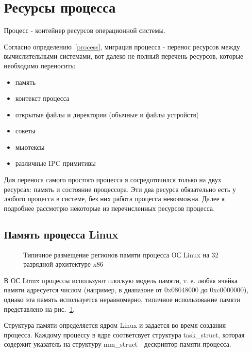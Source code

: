 \section{Ресурсы процесса}

\begin{Def}\label{process}
Процесс - контейнер ресурсов операционной системы.
\end{Def}

Согласно определению~\ref{process}, миграция процесса - перенос ресурсов между вычислительными системами, вот далеко не полный перечень ресурсов, которые необходимо переносить:

\begin{itemize}

    \item память
    \item контекст процесса
    \item открытые файлы и директории (обычные и файлы устройств)
    \item сокеты
    \item мьютексы
    \item различные IPC примитивы

\end{itemize}

Для переноса самого простого процесса я сосредоточился только на двух ресурсах: память и состояние процессора. Эти два ресурса обязательно есть у любого процесса в системе, без них работа процесса невозможна. Далее я подробнее рассмотрю некоторые из перечисленных ресурсов процесса. 

\subsection{Память процесса Linux}

\begin{figure}[h]
\caption{Типичное размещение регионов памяти процесса ОС Linux на 32 разрядной архитектуре x86}
\label{pic:memory_layout}
\end{figure}

В ОС Linux процессы используют плоскую модель памяти, т. е. любая ячейка памяти адресуется числом (например, в диапазоне от 0x08048000 до 0xc0000000), однако эта память используется неравномерно, типичное использование памяти представлено на рис.~\ref{pic:memory_layout}.

Структура памяти определяется ядром Linux и задается во время создания процесса. Каждому процессу в ядре соответсвует структура task\_struct, которая содержит указатель на структуру mm\_struct - дескриптор памяти процесса.

